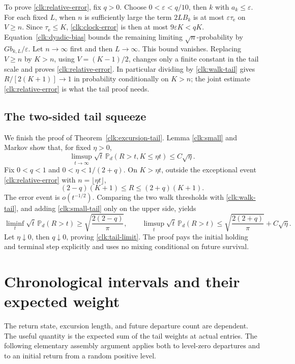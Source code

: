 \documentclass[11pt]{amsart}
\theoremstyle{definition}
\theoremstyle{remark}
\newcommand{\PP}{\mathbb P}
\begin{document}
To prove \eqref{clk:relative-error}, fix $q>0$. Choose
$0<\varepsilon<q/10$, then $k$ with $a_k\le\varepsilon$.
For each fixed $L$, when $n$ is sufficiently large the term $2L B_k$
is at most $\varepsilon \tau_{\mathrm e}$ on $V\ge n$. Since $\tau_{\mathrm e}\le K$,
\eqref{clk:clock-error} is then at most $9\varepsilon K<qK$.
Equation~\eqref{clk:dyadic-bias} bounds the remaining limiting
$\sqrt n$-probability by $Gb_{k,L}/\varepsilon$. Let $n\to\infty$
first and then $L\to\infty$. This bound vanishes. Replacing
$V\ge n$ by $K>n$, using $V=(K-1)/2$, changes only a finite
constant in the tail scale and proves \eqref{clk:relative-error}.
In particular dividing by \eqref{clk:walk-tail} gives
$R/[2(K+1)]\to1$ in probability conditionally on $K>n$; the
joint estimate \eqref{clk:relative-error} is what the tail proof needs.

\subsection{The two-sided tail squeeze}

We finish the proof of Theorem~\ref{clk:excursion-tail}. Lemma
\ref{clk:small} and Markov show that, for fixed $\eta>0$,
\begin{equation}\label{clk:small-tail}
 \limsup_{t\to\infty}\sqrt t\,
       \PP_d(R>t,K\le\eta t)\le C\sqrt\eta.
\end{equation}
Fix $0<q<1$ and $0<\eta<1/(2+q)$. On $K>\eta t$, outside the
exceptional event \eqref{clk:relative-error} with
$n=\lfloor\eta t\rfloor$,
\[
 (2-q)(K+1)\le R\le(2+q)(K+1).
\]
The error event is $o(t^{-1/2})$. Comparing the two walk thresholds
with \eqref{clk:walk-tail}, and adding \eqref{clk:small-tail} only
on the upper side, yields
\[
 \liminf_t\sqrt t\,\PP_d(R>t)\ge\sqrt{\frac{2(2-q)}\pi},
 \qquad
 \limsup_t\sqrt t\,\PP_d(R>t)
       \le\sqrt{\frac{2(2+q)}\pi}+C\sqrt\eta.
\]
Let $\eta\downarrow0$, then $q\downarrow0$, proving
\eqref{clk:tail-limit}. The proof pays the initial holding and
terminal step explicitly and uses no mixing conditional on future
survival.

\section{Chronological intervals and their expected weight}\label{sec:assembly}

The return state, excursion length, and future departure count are
dependent. The useful quantity is the expected sum of the tail weights
at actual entries. The following elementary assembly argument applies
both to level-zero departures and to an initial return from a random
positive level.
\end{document}
